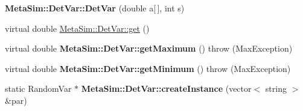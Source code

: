 \begin{DoxyCompactItemize}
\item 
{\bfseries Meta\+Sim\+::\+Det\+Var\+::\+Det\+Var} (double a\mbox{[}$\,$\mbox{]}, int s)\hypertarget{group__metasim__random_ga903b0d6bd2de0215e12c154bac094b47}{}\label{group__metasim__random_ga903b0d6bd2de0215e12c154bac094b47}

\item 
virtual double \hyperlink{group__metasim__random_ga91b5ba566ff6005e2bdfc18f8691cd85}{Meta\+Sim\+::\+Det\+Var\+::get} ()
\item 
virtual double {\bfseries Meta\+Sim\+::\+Det\+Var\+::get\+Maximum} ()  throw (\+Max\+Exception)\hypertarget{group__metasim__random_ga497a4f7a09bd637f1032a4a773758804}{}\label{group__metasim__random_ga497a4f7a09bd637f1032a4a773758804}

\item 
virtual double {\bfseries Meta\+Sim\+::\+Det\+Var\+::get\+Minimum} ()  throw (\+Max\+Exception)\hypertarget{group__metasim__random_gabde8b77ad92bb24b4371250e32f3f5e0}{}\label{group__metasim__random_gabde8b77ad92bb24b4371250e32f3f5e0}

\item 
static Random\+Var $\ast$ {\bfseries Meta\+Sim\+::\+Det\+Var\+::create\+Instance} (vector$<$ string $>$ \&par)\hypertarget{group__metasim__random_ga26c0231a13becbba35cd539111540655}{}\label{group__metasim__random_ga26c0231a13becbba35cd539111540655}

\end{DoxyCompactItemize}

